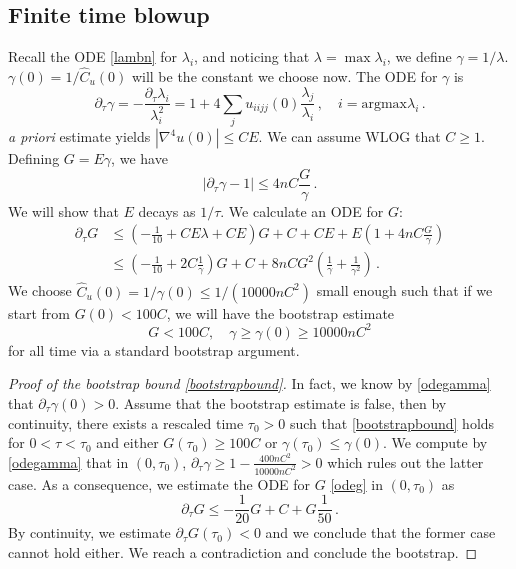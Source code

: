 \documentclass[12pt]{caltech_thesis}
\numberwithin{equation}{section}
\begin{document}
\subsection{Finite time blowup}\label{sec4}
Recall the ODE \eqref{lambn} for $\lambda_i$, and noticing that $\lambda=\max{\lambda_i}$, we define $\gamma=1/\lambda$. $\gamma(0)=1/\hat{C}_u(0)$ will be the constant we choose now. The ODE for $\gamma$ is  
$$
    \partial_\tau\gamma=-\frac{\partial_\tau\lambda_i}{\lambda_i^2}=1+4\sum_ju_{iijj}(0)\frac{\lambda_j}{\lambda_i}\,,\quad i=\text{argmax}{\lambda_i}\,.
$$ \textit{a priori} estimate yields $|\nabla^4u(0)|\leq CE$. We can assume WLOG that $C\geq 1$. Defining $G=E\gamma$, we have \begin{equation}\label{odegamma}|\partial_\tau\gamma-1|\leq 4nC\frac{G}{\gamma}\,.\end{equation} We will show that $E$ decays as $1/\tau$. We calculate an ODE for $G$:
\begin{equation}\label{odeg}\begin{aligned}
    \partial_\tau G&\leq (-\frac{1}{10}+CE\lambda+CE)G+C+C E+E(1+4nC\frac{G}{\gamma})\\&\leq(-\frac{1}{10}+2C\frac{1}{\gamma})G+C+8nCG^2(\frac{1}{\gamma}+\frac{1}{\gamma^2})\,.
\end{aligned}\end{equation}
We choose $\hat{C}_u(0)=1/\gamma(0)\leq1/(10000nC^2)$ small enough such that if we start from $G(0)< 100C$, we will have the bootstrap estimate \begin{equation}
    \label{bootstrapbound}G< 100C,\quad \gamma\geq \gamma(0)\geq10000nC^2
\end{equation} for all time via a standard bootstrap argument. 
\begin{proof}[Proof of the bootstrap bound \eqref{bootstrapbound}]
    In fact, we know by \eqref{odegamma} that $\partial_\tau\gamma(0)>0$.  Assume that the bootstrap estimate is false,   then by continuity, there exists a rescaled time $\tau_0>0$ such that \eqref{bootstrapbound} holds for $0<\tau<\tau_0$ and either $G(\tau_0)\geq 100C$ or $\gamma(\tau_0)\leq \gamma(0)$. We compute by \eqref{odegamma} that in $(0,\tau_0)$, $\partial_\tau\gamma\geq1-\frac{400nC^2}{10000nC^2}>0$ which rules out the latter case. As a consequence, we estimate the ODE for $G$ \eqref{odeg} in $(0,\tau_0)$ as $$\partial_\tau G\leq -\frac{1}{20} G+C+G\frac{1}{50}\,.$$By continuity, we estimate $\partial_\tau G(\tau_0)<0 $ and we conclude that the former case cannot hold either. We reach a contradiction and conclude the bootstrap.
\end{proof}
\end{document}

